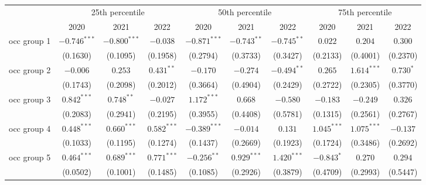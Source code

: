 \begin{tabular}{l|ccc|ccc|ccc|}
\toprule
{} & \multicolumn{3}{c}{25th percentile} & \multicolumn{3}{c}{50th percentile} & \multicolumn{3}{c}{75th percentile} \\
{} &            2020 &            2021 &            2022 &            2020 &            2021 &            2022 &            2020 &            2021 &            2022 \\
\midrule
occ group 1          &  $-0.746^{***}$ &  $-0.800^{***}$ &        $-0.038$ &  $-0.871^{***}$ &   $-0.743^{**}$ &   $-0.745^{**}$ &         $0.022$ &         $0.204$ &         $0.300$ \\
                     &        (0.1630) &        (0.1095) &        (0.1958) &        (0.2794) &        (0.3733) &        (0.3427) &        (0.2133) &        (0.4001) &        (0.2370) \\
occ group 2          &        $-0.006$ &         $0.253$ &    $0.431^{**}$ &        $-0.170$ &        $-0.274$ &   $-0.494^{**}$ &         $0.265$ &   $1.614^{***}$ &       $0.730^*$ \\
                     &        (0.1743) &        (0.2098) &        (0.2012) &        (0.3664) &        (0.4904) &        (0.2429) &        (0.2722) &        (0.2305) &        (0.3770) \\
occ group 3          &   $0.842^{***}$ &    $0.748^{**}$ &        $-0.027$ &   $1.172^{***}$ &         $0.668$ &        $-0.580$ &        $-0.183$ &        $-0.249$ &         $0.326$ \\
                     &        (0.2083) &        (0.2941) &        (0.2195) &        (0.3955) &        (0.4408) &        (0.5781) &        (0.1315) &        (0.2561) &        (0.2767) \\
occ group 4          &   $0.448^{***}$ &   $0.660^{***}$ &   $0.582^{***}$ &  $-0.389^{***}$ &        $-0.014$ &         $0.131$ &   $1.045^{***}$ &   $1.075^{***}$ &        $-0.137$ \\
                     &        (0.1033) &        (0.1195) &        (0.1274) &        (0.1437) &        (0.2669) &        (0.1923) &        (0.1724) &        (0.3486) &        (0.2692) \\
occ group 5          &   $0.464^{***}$ &   $0.689^{***}$ &   $0.771^{***}$ &   $-0.256^{**}$ &   $0.929^{***}$ &   $1.420^{***}$ &      $-0.843^*$ &         $0.270$ &         $0.294$ \\
                     &        (0.0502) &        (0.1001) &        (0.1485) &        (0.1085) &        (0.2926) &        (0.3879) &        (0.4709) &        (0.2993) &        (0.5447) \\

\end{tabular}

